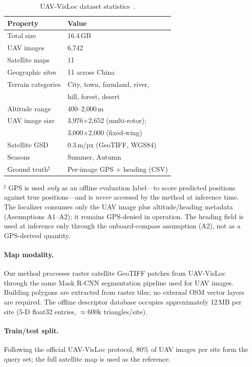 \documentclass[10pt]{article}
\theoremstyle{plain}
\theoremstyle{definition}
\begin{document}
\begin{table}[htbp]
\caption{UAV-VisLoc dataset statistics~\cite{uavvisloc2024}.}
\label{tab:dataset}
\centering\small
\begin{tabular}{ll}
\toprule
\textbf{Property} & \textbf{Value} \\
\midrule
Total size         & 16.4\,GB \\
UAV images         & 6,742 \\
Satellite maps     & 11 \\
Geographic sites   & 11 across China \\
Terrain categories & City, town, farmland, river, \\
                   & \quad hill, forest, desert \\
Altitude range     & 400--2,000\,m \\
UAV image size     & 3,976$\times$2,652 (multi-rotor);\\
                   & 3,000$\times$2,000 (fixed-wing) \\
Satellite GSD      & 0.3\,m/px (GeoTIFF, WGS84) \\
Seasons            & Summer, Autumn \\
Ground truth$^\sharp$ & Per-image GPS + heading (CSV) \\
\bottomrule
\end{tabular}

\smallskip
{\footnotesize $^\sharp$ GPS is used \emph{only} as an offline evaluation
label---to score predicted positions against true positions---and is
\emph{never} accessed by the method at inference time. The localizer consumes
only the UAV image plus altitude/heading metadata (Assumptions A1--A2); it
remains GPS-denied in operation. The heading field is used at inference only
through the onboard-compass assumption (A2), not as a GPS-derived quantity.}
\end{table}

\paragraph{Map modality.}
Our method processes raster satellite GeoTIFF patches from UAV-VisLoc through
the same Mask R-CNN segmentation pipeline used for UAV images.
Building polygons are extracted from raster tiles; no external OSM vector
layers are required.
The offline descriptor database occupies approximately 12\,MB per site
(5-D float32 entries, ${\approx}600\text{k}$ triangles/site).

\paragraph{Train/test split.}
Following the official UAV-VisLoc protocol, 80\% of UAV images per site form
the query set; the full satellite map is used as the reference.
\end{document}
